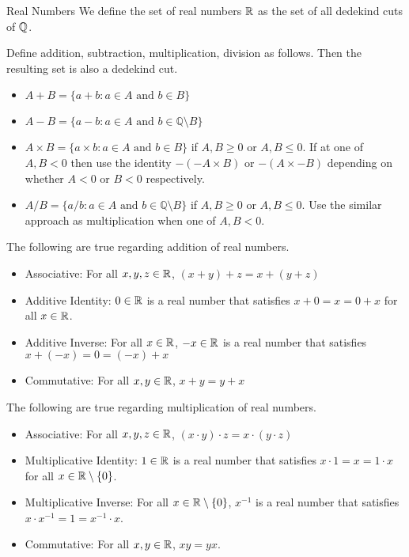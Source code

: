 \documentclass[a4paper]{article}
\begin{document}
\begin{defn}{Real Numbers}{} We define the set of real numbers $\mathbb{R}$ as the set of all dedekind cuts of $\mathbb{Q}$. 
\end{defn}

\begin{prp}{}{} Define addition, subtraction, multiplication, division as follows. Then the resulting set is also a dedekind cut. 
\begin{itemize}
\item $A+B=\{a+b:a\in A\text{ and }b\in B\}$
\item $A-B=\{a-b:a\in A\text{ and }b\in \mathbb{Q}\setminus B\}$
\item $A\times B=\{a\times b:a\in A\text{ and }b\in B\}$ if $A,B\geq 0$ or $A,B\leq 0$. If at one of $A,B<0$ then use the identity $-(-A\times B)$ or $-(A\times -B)$ depending on whether $A<0$ or $B<0$ respectively. 
\item $A/B=\{a/b:a\in A\text{ and }b\in \mathbb{Q}\setminus B\}$ if $A,B\geq 0$ or $A,B\leq 0$. Use the similar approach as multiplication when one of $A,B<0$. 
\end{itemize}
\end{prp}

\begin{prp}{}{} The following are true regarding addition of real numbers. 
\begin{itemize}
\item Associative: For all $x,y,z\in\mathbb{R}$, $(x+y)+z=x+(y+z)$
\item Additive Identity: $0\in\mathbb{R}$ is a real number that satisfies $x+0=x=0+x$ for all $x\in\mathbb{R}$. 
\item Additive Inverse: For all $x\in\mathbb{R}$, $-x\in\mathbb{R}$ is a real number that satisfies $x+(-x)=0=(-x)+x$
\item Commutative: For all $x,y\in\mathbb{R}$, $x+y=y+x$
\end{itemize}
\end{prp}

\begin{prp}{}{} The following are true regarding multiplication of real numbers. 
\begin{itemize}
\item Associative: For all $x,y,z\in\mathbb{R}$, $(x\cdot y)\cdot z=x\cdot(y\cdot z)$
\item Multiplicative Identity: $1\in\mathbb{R}$ is a real number that satisfies $x\cdot 1=x=1\cdot x$ for all $x\in\mathbb{R}\setminus\{0\}$. 
\item Multiplicative Inverse: For all $x\in\mathbb{R}\setminus\{0\}$, $x^{-1}$ is a real number that satisfies $x\cdot x^{-1}=1=x^{-1}\cdot x$. 
\item Commutative: For all $x,y\in\mathbb{R}$, $xy=yx$. 
\end{itemize}
\end{prp}
\end{document}

